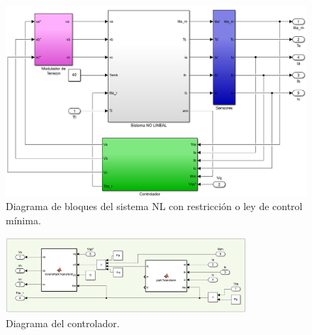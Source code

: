 \documentclass{article}
\begin{document}
\begin{enumerate}[label=\roman*.]
    \begin{figure}[H]
        \centering
        \includegraphics[width=1\textwidth]{realimentacion.png}
        \caption{Diagrama de bloques del sistema NL con restricción o ley de control mínima.}
    \end{figure}

    \begin{figure}[H]
        \centering
        \includegraphics[width=0.8\textwidth]{controlador.png}
        \caption{Diagrama del controlador.}
    \end{figure}


\end{enumerate}
\end{document}
